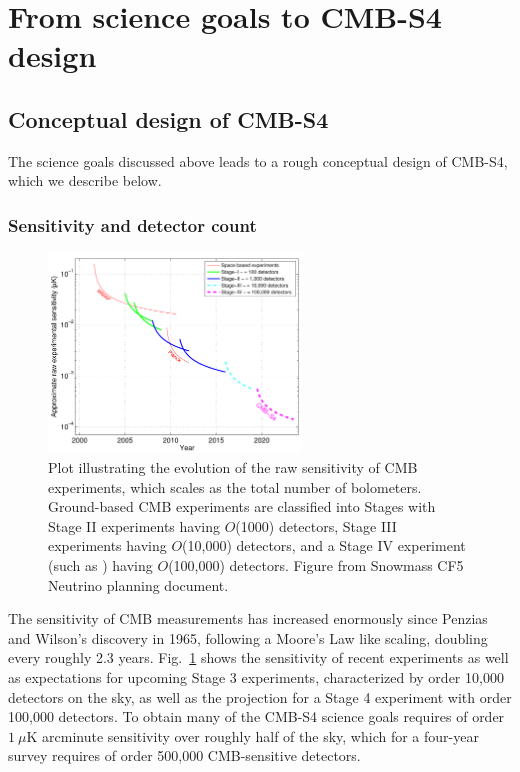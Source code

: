 \section{From science goals to CMB-S4 design}


\subsection{Conceptual design of CMB-S4}

The science goals discussed above leads to a rough conceptual design of CMB-S4, which we describe below.

\subsubsection{Sensitivity and detector count}

\begin{figure}[t]
\centering \includegraphics[width=0.6\textwidth]{Intro/expt_progress.pdf}
\caption{Plot illustrating the evolution of the raw sensitivity of CMB
  experiments, which scales as the total number of
  bolometers. Ground-based CMB experiments are classified into Stages
  with Stage II experiments having $O$(1000) detectors, Stage III
  experiments having $O$(10,000) detectors, and a Stage IV experiment
  (such as \cmbexp) having $O$(100,000) detectors. Figure from Snowmass  CF5
  Neutrino planning document.}
\label{fig:expt_progress-intro}
\end{figure}

The sensitivity of CMB measurements has increased enormously since Penzias and Wilson's discovery in 1965, following a Moore's Law like scaling, doubling every roughly 2.3 years. Fig.~\ref{fig:expt_progress-intro} shows the sensitivity of recent experiments as well as expectations for upcoming Stage 3 experiments, characterized by order 10,000 detectors on the sky, as well as the projection for a Stage 4 experiment with order 100,000 detectors. To obtain many of the CMB-S4 science goals requires of order $1~\mu$K arcminute sensitivity over roughly half of the sky, which for a four-year survey requires of order 500,000 CMB-sensitive detectors. 

